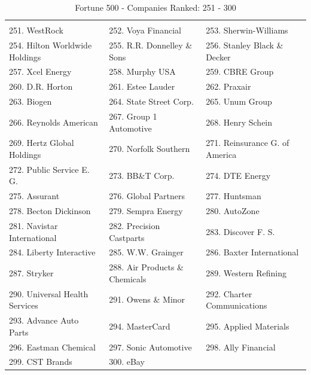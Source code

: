 \documentclass{book}
\begin{document}
\begin{table}[H]
\centering
\caption{Fortune 500 - Companies Ranked: 251 - 300}
\begin{tabular}{lll}
\hline
\\ 251. WestRock 
&  252. Voya Financial 
&  253. Sherwin-Williams 
\\ 254. Hilton Worldwide Holdings 
&  255. R.R. Donnelley \& Sons 
&  256. Stanley Black \& Decker 
\\ 257. Xcel Energy 
&  258. Murphy USA 
&  259. CBRE Group 
\\ 260. D.R. Horton 
&  261. Estee Lauder 
&  262. Praxair 
\\ 263. Biogen 
&  264. State Street Corp. 
&  265. Unum Group 
\\ 266. Reynolds American 
&  267. Group 1 Automotive 
&  268. Henry Schein 
\\ 269. Hertz Global Holdings 
&  270. Norfolk Southern 
&  271. Reinsurance G. of America 
\\ 272. Public Service E. G. 
&  273. BB\&T Corp. 
&  274. DTE Energy 
\\ 275. Assurant 
&  276. Global Partners 
&  277. Huntsman 
\\ 278. Becton Dickinson 
&  279. Sempra Energy 
&  280. AutoZone 
\\ 281. Navistar International 
&  282. Precision Castparts 
&  283. Discover F. S. 
\\ 284. Liberty Interactive 
&  285. W.W. Grainger 
&  286. Baxter International 
\\ 287. Stryker 
&  288. Air Products \& Chemicals 
&  289. Western Refining 
\\ 290. Universal Health Services 
&  291. Owens \& Minor 
&  292. Charter Communications 
\\ 293. Advance Auto Parts 
&  294. MasterCard 
&  295. Applied Materials 
\\ 296. Eastman Chemical 
&  297. Sonic Automotive 
&  298. Ally Financial 
\\ 299. CST Brands 
&  300. eBay 
&   
 \\ \hline

\end{tabular}
\end{table}
\end{document}

